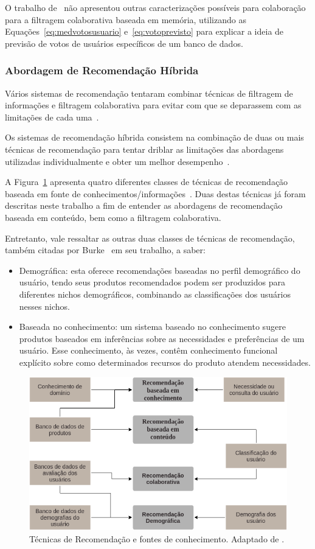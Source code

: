 O trabalho de~\cite{breese1998empirical} não apresentou outras caracterizações possíveis para colaboração para a filtragem colaborativa baseada em memória, utilizando as Equações~\ref{eq:medvotosusuario} e~\ref{eq:votoprevisto} para explicar a ideia de previsão de votos de usuários específicos de um banco de dados.


\subsubsection{Abordagem de Recomendação Híbrida}

Vários sistemas de recomendação tentaram combinar técnicas de filtragem de informações e filtragem colaborativa para evitar com que se deparassem com as limitações de cada uma~\cite{good1999combining}.

Os sistemas de recomendação híbrida consistem na combinação de duas ou mais técnicas de recomendação para tentar driblar as limitações das abordagens utilizadas individualmente e obter um melhor desempenho~\cite{burke2002hybrid}.

A Figura~\ref{img:recomendacao} apresenta quatro diferentes classes de técnicas de recomendação baseada em fonte de conhecimentos/informações~\cite{burke2002hybrid}. Duas destas técnicas já foram descritas neste trabalho a fim de entender as abordagens de recomendação baseada em conteúdo, bem como a filtragem colaborativa.

Entretanto, vale ressaltar as outras duas classes de técnicas de recomendação, também citadas por Burke~\cite{burke2002hybrid} em seu trabalho, a saber: 

\begin{itemize}
\item  Demográfica: esta oferece recomendações baseadas no perfil demográfico do usuário, tendo seus produtos recomendados podem ser produzidos para diferentes nichos demográficos, combinando as classificações dos usuários nesses nichos.
\end{itemize}

\begin{itemize}
\item  Baseada no conhecimento: um sistema baseado no conhecimento sugere produtos baseados em inferências sobre as necessidades e preferências de um usuário. Esse conhecimento, às vezes, contêm conhecimento funcional explícito sobre como determinados recursos do produto atendem necessidades. 
\end{itemize}

\begin{figure}[H]
\centering
\includegraphics[width=.8\textwidth]{figuras/secao-referencial/tecnicasRecomendacao.png}
\caption{Técnicas de Recomendação e fontes de conhecimento. Adaptado de \cite{burke2007hybrid}.}
\label{img:recomendacao}
\end{figure}

